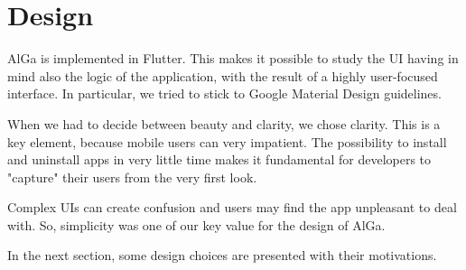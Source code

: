 \chapter{Design}
\label{chap:design}
AlGa is implemented in Flutter. This makes it possible to study the UI having in mind also the logic of the application, with the result of a highly user-focused interface.
In particular, we tried to stick to Google Material Design guidelines. 

When we had to decide between beauty and clarity, we chose clarity. This is a key element, because mobile users can very impatient. The possibility to install and uninstall apps in very little time makes it fundamental for developers to "capture" their users from the very first look.

Complex UIs can create confusion and users may find the app unpleasant to deal with. So, simplicity was one of our key value for the design of AlGa.

In the next section, some design choices are presented with their motivations.

